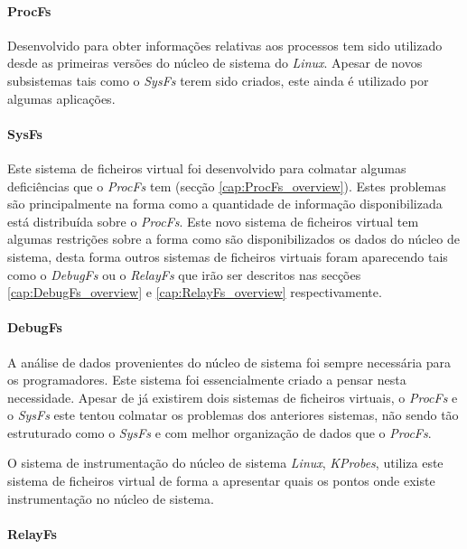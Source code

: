 \paragraph*{ProcFs}\label{cap:ProcFs_overview}

Desenvolvido para obter informações relativas aos processos tem sido utilizado desde as primeiras versões do núcleo de sistema do \textit{Linux}.
Apesar de novos subsistemas tais como o \textit{SysFs} terem sido criados, este ainda é utilizado por algumas aplicações.

\paragraph*{SysFs}\label{cap:SysFs_overview}

Este sistema de ficheiros virtual foi desenvolvido para colmatar algumas deficiências que o \textit{ProcFs} tem (secção \ref{cap:ProcFs_overview}).
Estes problemas são principalmente na forma como a quantidade de informação disponibilizada está distribuída sobre o \textit{ProcFs}.
Este novo sistema de ficheiros virtual tem algumas restrições sobre a forma como são disponibilizados os dados do núcleo de sistema, desta forma outros sistemas de ficheiros virtuais foram aparecendo tais como o \textit{DebugFs} ou o \textit{RelayFs} que irão ser descritos nas secções \ref{cap:DebugFs_overview} e \ref{cap:RelayFs_overview} respectivamente.

\paragraph*{DebugFs}\label{cap:DebugFs_overview}

A análise de dados provenientes do núcleo de sistema foi sempre necessária para os programadores.
Este sistema foi essencialmente criado a pensar nesta necessidade.
Apesar de já existirem dois sistemas de ficheiros virtuais, o \textit{ProcFs} e o \textit{SysFs} este tentou colmatar os problemas dos anteriores sistemas, não sendo tão estruturado como o \textit{SysFs} e com melhor organização de dados que o \textit{ProcFs}.

O sistema de instrumentação do núcleo de sistema \textit{Linux}, \textit{KProbes}, utiliza este sistema de ficheiros virtual de forma a apresentar quais os pontos onde existe instrumentação no núcleo de sistema.

\paragraph*{RelayFs}\label{cap:RelayFs_overview}

